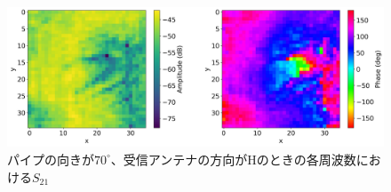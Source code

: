 \documentclass[11pt,a4paper,uplatex]{ujarticle}
\begin{document}
\begin{figure}[tbp]
\begin{minipage}[b]{0.995\textwidth}
      \centering
      \includegraphics[keepaspectratio, width=140mm]{Images/python/yokonarabe/019/170.png}
    \end{minipage}
    \caption{パイプの向きが$70^{\circ}$、受信アンテナの方向がHのときの各周波数における$S_{21}$}
  \end{figure}
\end{document}

